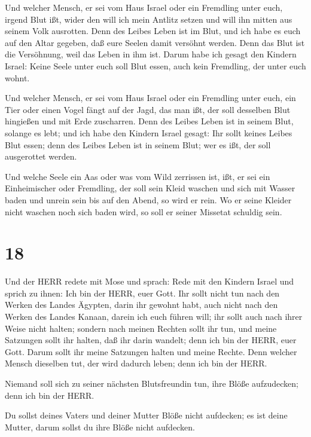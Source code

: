  Und welcher Mensch, er sei vom Haus Israel oder ein
Fremdling unter euch, irgend Blut ißt, wider den will ich mein Antlitz
setzen und will ihn mitten aus seinem Volk ausrotten.  Denn
des Leibes Leben ist im Blut, und ich habe es euch auf den Altar
gegeben, daß eure Seelen damit versöhnt werden. Denn das Blut ist die
Versöhnung, weil das Leben in ihm ist.  Darum habe ich
gesagt den Kindern Israel: Keine Seele unter euch soll Blut essen, auch
kein Fremdling, der unter euch wohnt.

 Und welcher Mensch, er sei vom Haus Israel oder ein
Fremdling unter euch, ein Tier oder einen Vogel fängt auf der Jagd, das
man ißt, der soll desselben Blut hingießen und mit Erde zuscharren.
 Denn des Leibes Leben ist in seinem Blut, solange es lebt;
und ich habe den Kindern Israel gesagt: Ihr sollt keines Leibes Blut
essen; denn des Leibes Leben ist in seinem Blut; wer es ißt, der soll
ausgerottet werden.

 Und welche Seele ein Aas oder was vom Wild zerrissen ist,
ißt, er sei ein Einheimischer oder Fremdling, der soll sein Kleid
waschen und sich mit Wasser baden und unrein sein bis auf den Abend, so
wird er rein.  Wo er seine Kleider nicht waschen noch sich
baden wird, so soll er seiner Missetat schuldig sein.

\hypertarget{section-17}{%
\section{18}\label{section-17}}

 Und der HERR redete mit Mose und sprach:  Rede
mit den Kindern Israel und sprich zu ihnen: Ich bin der HERR, euer Gott.
 Ihr sollt nicht tun nach den Werken des Landes Ägypten,
darin ihr gewohnt habt, auch nicht nach den Werken des Landes Kanaan,
darein ich euch führen will; ihr sollt auch nach ihrer Weise nicht
halten;  sondern nach meinen Rechten sollt ihr tun, und
meine Satzungen sollt ihr halten, daß ihr darin wandelt; denn ich bin
der HERR, euer Gott.  Darum sollt ihr meine Satzungen halten
und meine Rechte. Denn welcher Mensch dieselben tut, der wird dadurch
leben; denn ich bin der HERR.

 Niemand soll sich zu seiner nächsten Blutsfreundin tun,
ihre Blöße aufzudecken; denn ich bin der HERR.

 Du sollst deines Vaters und deiner Mutter Blöße nicht
aufdecken; es ist deine Mutter, darum sollst du ihre Blöße nicht
aufdecken.

